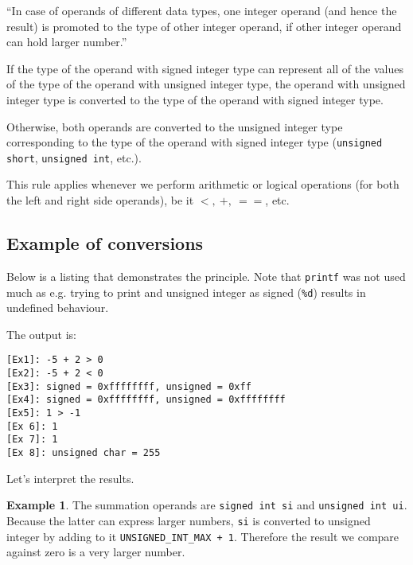\begin{adjustwidth}{1cm}{1cm}
``In case of operands of different data types, one integer operand (and hence the result) is promoted to the type of other integer operand, if other integer operand can hold larger number.''
\end{adjustwidth}

If the type of the operand with signed integer type can represent all of the values of the type of the operand with unsigned integer type, the operand with unsigned integer type is converted to the type of the operand with signed integer type.

Otherwise, both operands are converted to the unsigned integer type corresponding to the type of the operand with signed integer type (\texttt{unsigned short}, \texttt{unsigned int}, etc.).

This rule applies whenever we perform arithmetic or logical operations (for both the left and right side operands), be it $<, \: +, \: ==$, etc.



\subsection{Example of conversions}

Below is a listing that demonstrates the principle. Note that \texttt{printf} was not used much as e.g. trying to print and unsigned integer as signed (\texttt{\%d}) results in undefined behaviour.



The output is:
\begin{verbatim}
[Ex1]: -5 + 2 > 0
[Ex2]: -5 + 2 < 0
[Ex3]: signed = 0xffffffff, unsigned = 0xff
[Ex4]: signed = 0xffffffff, unsigned = 0xffffffff
[Ex5]: 1 > -1
[Ex 6]: 1
[Ex 7]: 1
[Ex 8]: unsigned char = 255
\end{verbatim}


Let's interpret the results.

\textbf{Example 1}. The summation operands are \texttt{signed int si} and \texttt{unsigned int ui}. Because the latter can express larger numbers, \texttt{si} is converted to unsigned integer by adding to it \texttt{UNSIGNED\_INT\_MAX + 1}. Therefore the result we compare against zero is a very larger number.

